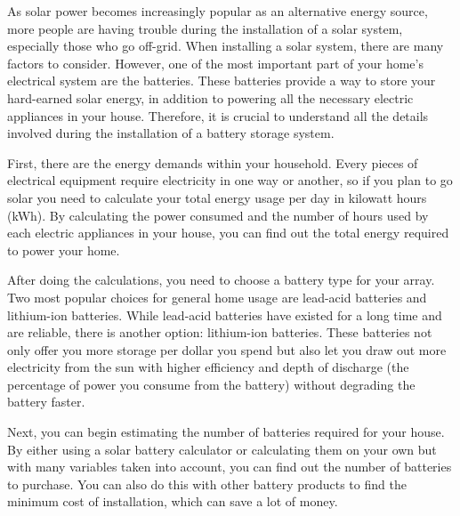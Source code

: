 \date{\today}



\maketitle
\thispagestyle{fancy}

\begin{multicols}{3}


As solar power becomes increasingly popular as an alternative energy source, more people are having trouble during the installation of a solar system, especially those who go off-grid. When installing a solar system, there are many factors to consider. However, one of the most important part of your home's electrical system are the batteries. These batteries provide a way to store your hard-earned solar energy, in addition to powering all the necessary electric appliances in your house. Therefore, it is crucial to understand all the details involved during the installation of a battery storage system.

First, there are the energy demands within your household. Every pieces of electrical equipment require electricity in one way or another, so if you plan to go solar you need to calculate your total energy usage per day in kilowatt hours (kWh). By calculating the power consumed and the number of hours used by each electric appliances in your house, you can find out the total energy required to power your home.

After doing the calculations, you need to choose a battery type for your array. Two most popular choices for general home usage are lead-acid batteries and lithium-ion batteries. While lead-acid batteries have existed for a long time and are reliable, there is another option: lithium-ion batteries. These batteries not only offer you more storage per dollar you spend but also let you draw out more electricity from the sun with higher efficiency and depth of discharge (the percentage of power you consume from the battery) without degrading the battery faster.

Next, you can begin estimating the number of batteries required for your house. By either using a solar battery calculator or calculating them on your own but with many variables taken into account, you can find out the number of batteries to purchase. You can also do this with other battery products to find the minimum cost of installation, which can save a lot of money.


\end{multicols}

